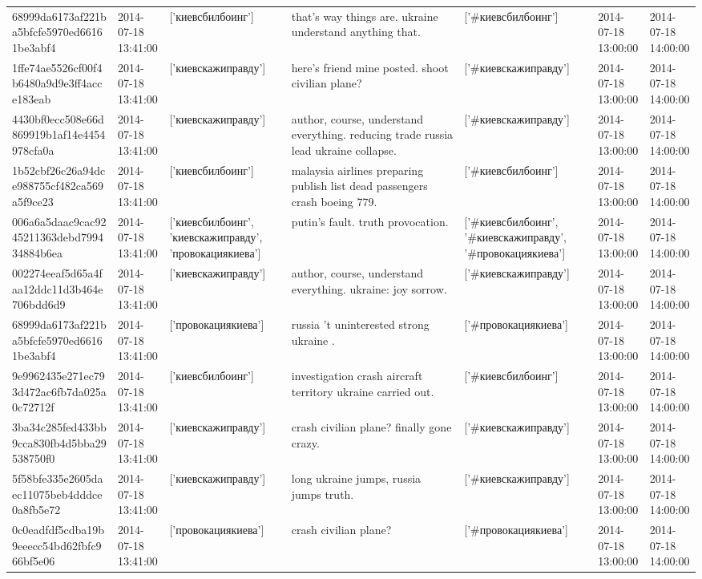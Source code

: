 \begin{tabular}{lllllll}
68999da6173af221ba5bfcfe5970ed66161be3abf4 & 2014-07-18 13:41:00 & ['киевсбилбоинг'] & that's way things are. ukraine understand anything that. & ['#киевсбилбоинг'] & 2014-07-18 13:00:00 & 2014-07-18 14:00:00 \\
1ffe74ae5526cf00f4b6480a9d9e3ff4acce183eab & 2014-07-18 13:41:00 & ['киевскажиправду'] & here's friend mine posted. shoot civilian plane? & ['#киевскажиправду'] & 2014-07-18 13:00:00 & 2014-07-18 14:00:00 \\
4430bf0ecc508e66d869919b1af14e4454978cfa0a & 2014-07-18 13:41:00 & ['киевскажиправду'] & author, course, understand everything. reducing trade russia lead ukraine collapse. & ['#киевскажиправду'] & 2014-07-18 13:00:00 & 2014-07-18 14:00:00 \\
1b52cbf26c26a94dce988755cf482ca569a5f9ce23 & 2014-07-18 13:41:00 & ['киевсбилбоинг'] & malaysia airlines preparing publish list dead passengers crash boeing 779. & ['#киевсбилбоинг'] & 2014-07-18 13:00:00 & 2014-07-18 14:00:00 \\
006a6a5daac9cac9245211363debd799434884b6ea & 2014-07-18 13:41:00 & ['киевсбилбоинг', 'киевскажиправду', 'провокациякиева'] & putin's fault. truth provocation. & ['#киевсбилбоинг', '#киевскажиправду', '#провокациякиева'] & 2014-07-18 13:00:00 & 2014-07-18 14:00:00 \\
002274eeaf5d65a4faa12ddc11d3b464e706bdd6d9 & 2014-07-18 13:41:00 & ['киевскажиправду'] & author, course, understand everything. ukraine: joy sorrow. & ['#киевскажиправду'] & 2014-07-18 13:00:00 & 2014-07-18 14:00:00 \\
68999da6173af221ba5bfcfe5970ed66161be3abf4 & 2014-07-18 13:41:00 & ['провокациякиева'] & russia 't uninterested strong ukraine . & ['#провокациякиева'] & 2014-07-18 13:00:00 & 2014-07-18 14:00:00 \\
9e9962435e271ec793d472ac6fb7da025a0c72712f & 2014-07-18 13:41:00 & ['киевсбилбоинг'] & investigation crash aircraft territory ukraine carried out. & ['#киевсбилбоинг'] & 2014-07-18 13:00:00 & 2014-07-18 14:00:00 \\
3ba34c285fed433bb9cca830fb4d5bba29538750f0 & 2014-07-18 13:41:00 & ['киевскажиправду'] & crash civilian plane? finally gone crazy. & ['#киевскажиправду'] & 2014-07-18 13:00:00 & 2014-07-18 14:00:00 \\
5f58bfe335e2605daec11075beb4dddce0a8fb5e72 & 2014-07-18 13:41:00 & ['киевскажиправду'] & long ukraine jumps, russia jumps truth. & ['#киевскажиправду'] & 2014-07-18 13:00:00 & 2014-07-18 14:00:00 \\
0c0eadfdf5cdba19b9eeecc54bd62fbfc966bf5e06 & 2014-07-18 13:41:00 & ['провокациякиева'] & crash civilian plane? & ['#провокациякиева'] & 2014-07-18 13:00:00 & 2014-07-18 14:00:00 \\

\end{tabular}
